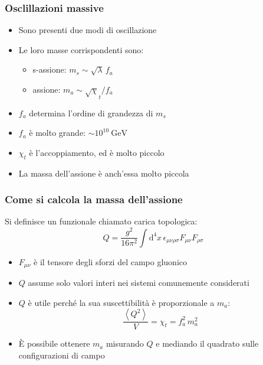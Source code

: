 \begin{frame}
    \frametitle{Osclillazioni massive}
    \begin{itemize}
        \item Sono presenti due modi di oscillazione
        \item Le loro masse corrispondenti sono:
            \begin{itemize}
                \item s-assione: $m_s \sim \sqrt\lambda\,f_a$
                \item assione: $m_a \sim \sqrt\chi_t/f_a$
            \end{itemize}
        \item $f_a$ determina l'ordine di grandezza di $m_s$
        \item $f_a$ è molto grande: $\sim 10^{10}\ \text{GeV}$
        \item $\chi_t$ è l'accoppiamento, ed è molto piccolo
        \item La massa dell'assione è anch'essa molto piccola
    \end{itemize}
\end{frame}

\begin{frame}
    \frametitle{Come si calcola la massa dell'assione}
    Si definisce un funzionale chiamato {\color{fzjblue} carica topologica}:
    $$Q = \frac{g^2}{16\pi^2}\int\mathrm{d}^4x\,%
    \epsilon_{\mu\nu\rho\sigma}F_{\mu\nu}F_{\rho\sigma}$$
    \begin{itemize}
        \item $F_{\mu\nu}$ è il tensore degli sforzi del campo gluonico
        \item $Q$ assume solo valori interi nei sistemi comunemente considerati
        \item $Q$ è utile perché la sua suscettibilità è proporzionale a $m_a$:
            $$\frac{\left<Q^2\right>}{V}=\chi_t=f_a^2\,m_a^2$$
        \item È possibile ottenere $m_a$ misurando $Q$ %
            e mediando il quadrato sulle configurazioni di campo
    \end{itemize}
\end{frame}

